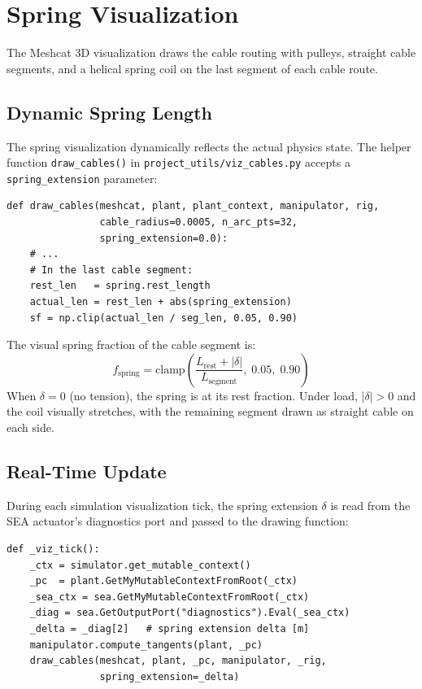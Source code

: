 \documentclass[11pt,a4paper]{article}
\begin{document}
\section{Spring Visualization}
\label{sec:viz}

The Meshcat 3D visualization draws the cable routing with pulleys, straight cable segments, and a helical spring coil on the last segment of each cable route.

\subsection{Dynamic Spring Length}

The spring visualization dynamically reflects the actual physics state.  The helper function \texttt{draw\_cables()} in \texttt{project\_utils/viz\_cables.py} accepts a \texttt{spring\_extension} parameter:

\begin{lstlisting}[caption={Dynamic spring fraction from physics state.}]
def draw_cables(meshcat, plant, plant_context, manipulator, rig,
                cable_radius=0.0005, n_arc_pts=32,
                spring_extension=0.0):
    # ...
    # In the last cable segment:
    rest_len   = spring.rest_length
    actual_len = rest_len + abs(spring_extension)
    sf = np.clip(actual_len / seg_len, 0.05, 0.90)
\end{lstlisting}

\begin{codemath}
The visual spring fraction of the cable segment is:
\[
    f_{\mathrm{spring}} = \mathrm{clamp}\!\left(\frac{L_{\mathrm{rest}} + |\delta|}{L_{\mathrm{segment}}},\; 0.05,\; 0.90\right)
\]
When $\delta = 0$ (no tension), the spring is at its rest fraction.  Under load, $|\delta| > 0$ and the coil visually stretches, with the remaining segment drawn as straight cable on each side.
\end{codemath}

\subsection{Real-Time Update}

During each simulation visualization tick, the spring extension $\delta$ is read from the SEA actuator's diagnostics port and passed to the drawing function:

\begin{lstlisting}[caption={Visualization tick with live spring extension.}]
def _viz_tick():
    _ctx = simulator.get_mutable_context()
    _pc  = plant.GetMyMutableContextFromRoot(_ctx)
    _sea_ctx = sea.GetMyMutableContextFromRoot(_ctx)
    _diag = sea.GetOutputPort("diagnostics").Eval(_sea_ctx)
    _delta = _diag[2]   # spring extension delta [m]
    manipulator.compute_tangents(plant, _pc)
    draw_cables(meshcat, plant, _pc, manipulator, _rig,
                spring_extension=_delta)
\end{lstlisting}
\end{document}
